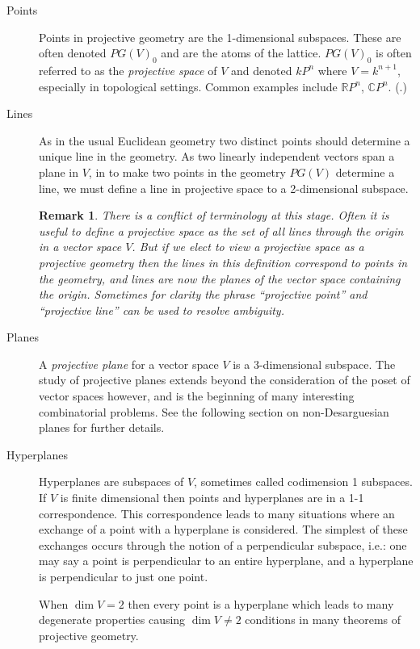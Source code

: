 \documentclass[12pt]{article}
\newtheorem{remark}[thm]{Remark}
\begin{document}
\begin{description}
\item[Points]  Points in projective geometry are the 1-dimensional subspaces.  These are often denoted $PG(V)_0$ and are the atoms of the lattice.  $PG(V)_0$ is often referred to as the \emph{projective space} of $V$ and denoted $kP^n$ where $V=k^{n+1}$, especially in  topological settings.  Common examples include $\mathbb{R}P^n$, $\mathbb{C}P^n$.
(.)  

\item[Lines]
As in the usual Euclidean geometry two distinct points should determine a unique line in the geometry.  As two linearly independent vectors span a plane in $V$, in  to make two points in the geometry $PG(V)$ determine a line, we must define a line in projective space to  a 2-dimensional subspace.

\begin{remark}
There is a conflict of terminology at this stage.  Often it is useful to define a projective space as the set of all lines through the origin in a vector space $V$.  But if we elect to view a projective space as a projective geometry then the lines in this definition correspond to points in the geometry, and lines are now the planes of the vector space containing the origin.  Sometimes for clarity the phrase ``projective point'' and ``projective line'' can be used to resolve ambiguity.
\end{remark}
\item[Planes]
A \emph{projective plane} for a vector space $V$ is a 3-dimensional subspace.  
The study of projective planes extends beyond the consideration of the poset of vector spaces however, and is the beginning of many interesting combinatorial problems.  See the following section on non-Desarguesian planes for further details.  
\item[Hyperplanes]
Hyperplanes are  subspaces of $V$, sometimes called codimension 1 subspaces.  If $V$ is finite dimensional then points and hyperplanes are in a 1-1 correspondence.  This correspondence leads to many situations where an exchange of a point with a hyperplane is considered.  The simplest of these exchanges occurs through  the notion of a perpendicular subspace, i.e.: one may say a point is perpendicular to an entire hyperplane, and a hyperplane is perpendicular to just one point.

When $\dim V=2$ then every point is a hyperplane which leads to many degenerate properties causing $\dim V\neq 2$ conditions in many theorems of projective geometry.
\end{description}
\end{document}

